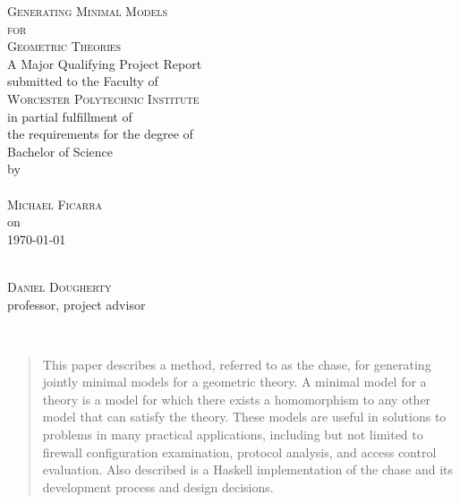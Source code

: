 \documentclass[11pt, a4paper]{article}
\begin{document}
\begin{titlepage}
\begin{center}
	\textsc{
		{\huge Generating Minimal Models}\\[0.2cm]
		{\Large for}\\[0.3cm]
		{\huge Geometric Theories}
	}\\[1cm]
	A Major Qualifying Project Report\\
	submitted to the Faculty of\\[0.7cm]
	\textsc{ \large Worcester Polytechnic Institute }\\[0.7cm]
	in partial fulfillment of\\
	the requirements for the degree of\\
	Bachelor of Science\\[1cm]
	by\\[1cm]
	~\hspace{2cm}\dotfill\hspace{2cm}~\\
	\textsc{\Large Michael Ficarra}\\[1cm]
	on\\[1cm]
	{\Large \today}\\
	\vfill
	\begin{flushright}
		\hspace{8cm}\dotfill \\
		\textsc{Daniel Dougherty}\\
		professor, project advisor\\
	\end{flushright}
\end{center}
\end{titlepage}



~\\
\vfill
\begin{abstract}
This paper describes a method, referred to as the chase, for generating jointly
minimal models for a geometric theory. A minimal model for a theory is a model
for which there exists a homomorphism to any other model that can satisfy the
theory. These models are useful in solutions to problems in many practical
applications, including but not limited to firewall configuration examination,
protocol analysis, and access control evaluation. Also described is a Haskell
implementation of the chase and its development process and design decisions.
\end{abstract}
\vfill
~\\
\newpage
\end{document}
